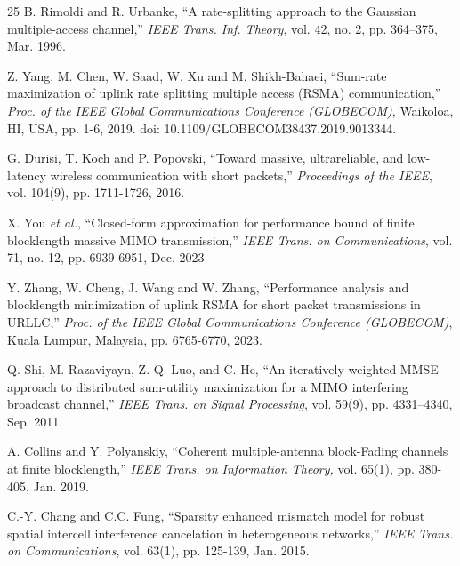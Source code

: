 \documentclass[a4paper, 12pt, onecolumn, journal, twoside, draftclsnofoot]{IEEEtran}
\begin{document}
\begin{thebibliography}{25} 
B. Rimoldi and R. Urbanke, ``A rate-splitting approach to the Gaussian multiple-access channel,'' \emph{IEEE Trans. Inf. Theory},  vol. 42, no. 2, pp. 364–375, Mar. 1996.

Z. Yang, M. Chen, W. Saad, W. Xu and M. Shikh-Bahaei, ``Sum-rate maximization of uplink rate splitting multiple access (RSMA) communication,'' \emph{Proc. of the IEEE Global Communications Conference (GLOBECOM)}, Waikoloa, HI, USA, pp. 1-6, 2019.  doi: 10.1109/GLOBECOM38437.2019.9013344.

G. Durisi, T. Koch and P. Popovski, ``Toward massive, ultrareliable, and low-latency wireless communication with short packets,'' \emph{Proceedings of the IEEE}, vol. 104(9), pp. 1711-1726, 2016.

X. You \emph{et al.}, ``Closed-form approximation for performance bound of finite blocklength massive MIMO transmission,'' \emph{IEEE Trans. on Communications}, vol. 71, no. 12, pp. 6939-6951, Dec. 2023

Y. Zhang, W. Cheng, J. Wang and W. Zhang, ``Performance analysis and blocklength minimization of uplink RSMA for short packet transmissions in URLLC,'' \emph{Proc. of the IEEE Global Communications Conference (GLOBECOM)}, Kuala Lumpur, Malaysia, pp. 6765-6770, 2023.

Q. Shi, M. Razaviyayn, Z.-Q. Luo, and C. He, ``An iteratively weighted MMSE approach to distributed sum-utility maximization for a MIMO interfering broadcast channel,'' \emph{IEEE Trans. on Signal Processing}, vol. 59(9), pp. 4331–4340, Sep. 2011.

A. Collins and Y. Polyanskiy, ``Coherent multiple-antenna block-Fading channels at finite blocklength,'' \emph{IEEE Trans. on Information Theory,} vol. 65(1), pp. 380-405, Jan. 2019.

C.-Y. Chang and C.C. Fung, ``Sparsity enhanced mismatch model for robust spatial intercell interference cancelation in heterogeneous networks,'' \emph{IEEE Trans. on Communications}, vol. 63(1), pp. 125-139, Jan. 2015.



\end{thebibliography}
\end{document}
